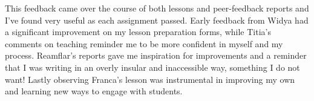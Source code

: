 \documentclass[paper=a4,justified,a4paper]{tufte-handout}
\begin{document}
This feedback came over the course of both lessons and peer-feedback
reports and I've found very useful as each assignment passed. Early
feedback from Widya had a significant improvement on my lesson
preparation forms, while Titia's comments on teaching reminder me to be
more confident in myself and my process. Reamflar's reports gave me
inspiration for improvements and a reminder that I was writing in an
overly insular and inaccessible way, something I do not want! Lastly
observing Franca's lesson was instrumental in improving my own and
learning new ways to engage with students.
\end{document}
